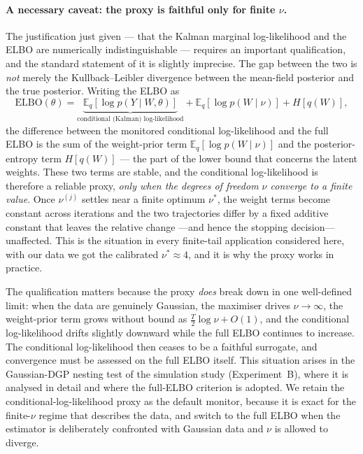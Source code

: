 \documentclass[11pt, a4paper, oneside]{article}
\begin{document}
\paragraph{A necessary caveat: the proxy is faithful only for finite
$\nu$.}
The justification just given --- that the Kalman marginal
log-likelihood and the ELBO are numerically indistinguishable ---
requires an important qualification, and the standard statement of it
is slightly imprecise. The gap between the two is \emph{not} merely
the Kullback--Leibler divergence between the mean-field posterior and
the true posterior. Writing the ELBO as
\[
\mathrm{ELBO}(\theta)
= \underbrace{\mathbb{E}_q[\log p(Y\mid W,\theta)]}_{\text{conditional (Kalman) log-likelihood}}
+ \mathbb{E}_q[\log p(W\mid\nu)]
+ H[q(W)],
\]
the difference between the monitored conditional log-likelihood and
the full ELBO is the sum of the weight-prior term
$\mathbb{E}_q[\log p(W\mid\nu)]$ and the posterior-entropy term
$H[q(W)]$ --- the part of the lower bound that concerns the latent
weights. These two terms are stable, and the conditional
log-likelihood is therefore a reliable proxy, \emph{only when the
degrees of freedom $\nu$ converge to a finite value}. Once
$\nu^{(j)}$ settles near a finite optimum $\nu^*$, the weight terms
become constant across iterations and the two trajectories differ by
a fixed additive constant that leaves the relative change ---and hence
the stopping decision--- unaffected. This is the situation in every
finite-tail application considered here, with our data we got the calibrated
$\nu^* \approx 4$, and it is why the proxy works in practice.

The qualification matters because the proxy \emph{does} break down in
one well-defined limit: when the data are genuinely Gaussian, the
maximiser drives $\nu \to \infty$, the weight-prior term grows without
bound as $\tfrac{T}{2}\log\nu + O(1)$, and the conditional
log-likelihood drifts slightly downward while the full ELBO continues
to increase. The conditional log-likelihood then ceases to be a
faithful surrogate, and convergence must be assessed on the full ELBO
itself. This situation arises in the Gaussian-DGP nesting test of the
simulation study (Experiment~B), where it is analysed in detail and
where the full-ELBO criterion is adopted. We retain the conditional-log-likelihood
proxy as the default monitor, because it is exact for the finite-$\nu$
regime that describes the data, and switch to the full ELBO when the
estimator is deliberately confronted with Gaussian data and $\nu$ is
allowed to diverge.
\end{document}
